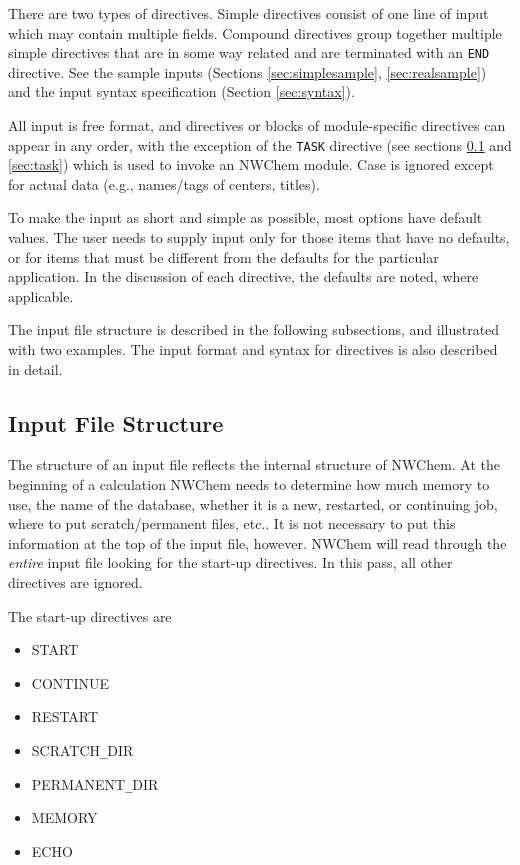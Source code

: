 There are two types of directives.  Simple directives consist of one
line of input which may contain multiple fields.  Compound directives
group together multiple simple directives that are in some way
related and are terminated with an \verb+END+ directive.  See the
sample inputs (Sections \ref{sec:simplesample}, \ref{sec:realsample})
and the input syntax specification (Section \ref{sec:syntax}).

All input is free format, and directives or blocks of module-specific
directives can appear in any order, with the exception of the
\verb+TASK+ directive (see sections \ref{sec:inputstructure} and
\ref{sec:task}) which is used to invoke an NWChem module.  Case is
ignored except for actual data (e.g., names/tags of centers, titles).

To make the input as short and simple as possible, most options have
default values.  The user needs to supply input only for those items that
have no defaults, or for items that must be different from the defaults
for the particular application.  In the discussion of each directive, the
defaults are noted, where applicable.

The input file structure is described in the following subsections, and
illustrated with two examples.  The input format and syntax for directives
is also described in detail.

\subsection{Input File Structure}
\label{sec:inputstructure}

The structure of an input file reflects the internal structure of
NWChem.  At the beginning of a calculation NWChem needs to determine
how much memory to use, the name of the database, whether it is a new,
restarted, or continuing job, where to put scratch/permanent files,
etc..  It is not necessary to put this information at the top of the
input file, however.  NWChem will read through the {\em entire} input
file looking for the start-up directives.  In this pass, all other
directives are ignored.

The start-up directives are
\begin{itemize}
\item START
\item CONTINUE
\item RESTART
\item SCRATCH{\verb+_+}DIR
\item PERMANENT{\verb+_+}DIR
\item MEMORY
\item ECHO
\end{itemize}

